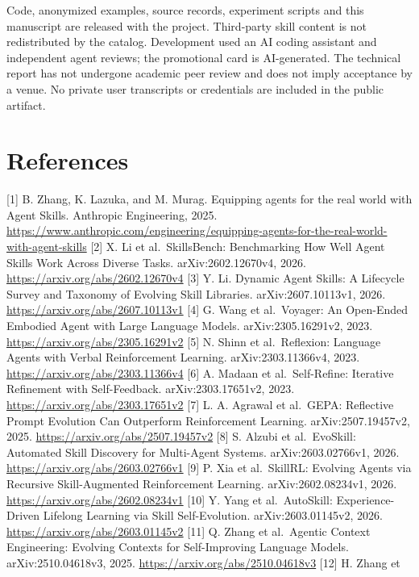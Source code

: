 \documentclass[
  11pt,
]{article}
\begin{document}
Code, anonymized examples, source records, experiment scripts and this
manuscript are released with the project. Third-party skill content is
not redistributed by the catalog. Development used an AI coding
assistant and independent agent reviews; the promotional card is
AI-generated. The technical report has not undergone academic peer
review and does not imply acceptance by a venue. No private user
transcripts or credentials are included in the public artifact.

\section{References}\label{references}

{[}1{]} B. Zhang, K. Lazuka, and M. Murag. Equipping agents for the real
world with Agent Skills. Anthropic Engineering, 2025.
\url{https://www.anthropic.com/engineering/equipping-agents-for-the-real-world-with-agent-skills}
{[}2{]} X. Li et al.~SkillsBench: Benchmarking How Well Agent Skills
Work Across Diverse Tasks. arXiv:2602.12670v4, 2026.
\url{https://arxiv.org/abs/2602.12670v4} {[}3{]} Y. Li. Dynamic Agent
Skills: A Lifecycle Survey and Taxonomy of Evolving Skill Libraries.
arXiv:2607.10113v1, 2026. \url{https://arxiv.org/abs/2607.10113v1}
{[}4{]} G. Wang et al.~Voyager: An Open-Ended Embodied Agent with Large
Language Models. arXiv:2305.16291v2, 2023.
\url{https://arxiv.org/abs/2305.16291v2} {[}5{]} N. Shinn et
al.~Reflexion: Language Agents with Verbal Reinforcement Learning.
arXiv:2303.11366v4, 2023. \url{https://arxiv.org/abs/2303.11366v4}
{[}6{]} A. Madaan et al.~Self-Refine: Iterative Refinement with
Self-Feedback. arXiv:2303.17651v2, 2023.
\url{https://arxiv.org/abs/2303.17651v2} {[}7{]} L. A. Agrawal et
al.~GEPA: Reflective Prompt Evolution Can Outperform Reinforcement
Learning. arXiv:2507.19457v2, 2025.
\url{https://arxiv.org/abs/2507.19457v2} {[}8{]} S. Alzubi et
al.~EvoSkill: Automated Skill Discovery for Multi-Agent Systems.
arXiv:2603.02766v1, 2026. \url{https://arxiv.org/abs/2603.02766v1}
{[}9{]} P. Xia et al.~SkillRL: Evolving Agents via Recursive
Skill-Augmented Reinforcement Learning. arXiv:2602.08234v1, 2026.
\url{https://arxiv.org/abs/2602.08234v1} {[}10{]} Y. Yang et
al.~AutoSkill: Experience-Driven Lifelong Learning via Skill
Self-Evolution. arXiv:2603.01145v2, 2026.
\url{https://arxiv.org/abs/2603.01145v2} {[}11{]} Q. Zhang et
al.~Agentic Context Engineering: Evolving Contexts for Self-Improving
Language Models. arXiv:2510.04618v3, 2025.
\url{https://arxiv.org/abs/2510.04618v3} {[}12{]} H. Zhang et
\end{document}
